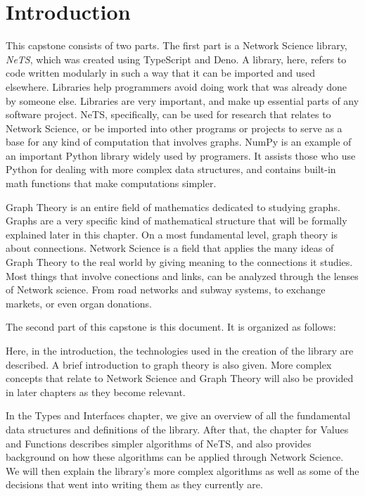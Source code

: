 \chapter{Introduction}

This capstone consists of two parts.
The first part is a Network Science library, \textit{NeTS},
which was created using TypeScript and Deno.
A library, here, refers to code written modularly in such a way that it can be imported and used elsewhere.
Libraries help programmers avoid doing work that was already done by someone else.
Libraries are very important, and make up essential parts of any software project.
NeTS, specifically, can be used for research that relates to Network Science,
or be imported into other programs or projects to serve as a base for any
kind of computation that involves graphs.
NumPy is an example of an important Python library widely used by programers.
It assists those who use Python for dealing with more complex data structures,
and contains built-in math functions that make computations simpler.

Graph Theory is an entire field of mathematics dedicated to studying graphs.
Graphs are a very specific kind of mathematical structure
that will be formally explained later in this chapter.
On a most fundamental level, graph theory is about connections.
Network Science is a field that applies the many ideas of Graph Theory to the real world
by giving meaning to the connections it studies.
Most things that involve conections and links,
can be analyzed through the lenses of Network science.
From road networks and subway systems, to exchange markets, or even organ donations.

The second part of this capstone is this document. It is organized as follows:

Here, in the introduction, the technologies used in the creation of the library are described.
A brief introduction to graph theory is also given.
More complex concepts that relate to Network Science and Graph Theory will also be
provided in later chapters as they become relevant.

In the Types and Interfaces chapter, we give an overview of all the fundamental
data structures and definitions of the library.
After that, the chapter for Values and Functions describes simpler algorithms
of NeTS, and also provides background on how these algorithms can be applied through Network Science.
We will then explain the library's more complex algorithms as well as some of the
decisions that went into writing them as they currently are.

